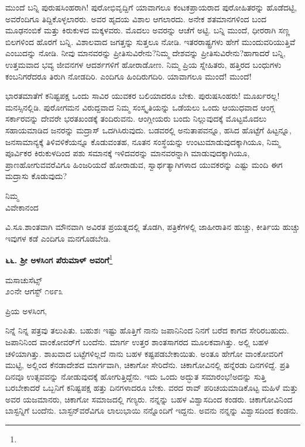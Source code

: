 ಮುಂದೆ ಬನ್ನಿ ಪುರುಷಸಿಂಹರಾಗಿ! ಪುರೋಭಿವೃದ್ದಿಗೆ ಯಾವಾಗಲೂ ಕಂಟಕಪ್ರಾಯರಾದ ಪುರೋಹಿತರನ್ನು ಹೊಡೆದಟ್ಟಿ, ಅವರೆಂದಿಗೂ ತಿದ್ದಿಕೊಳ್ಳಲಾರರು. ಅವರ ಹೃದಯ ವಿಶಾಲ ಆಗಲಾರದು. ಅನೇಕ ಶತಮಾನಗಳಿಂದ ಬಂದ ಮೂಢನಂಬಿಕೆ ಮತ್ತು ಕಿರುಕುಳದ ಮಕ್ಕಳವರು. ಮೊದಲು ಅವರನ್ನು ಆಚೆಗೆ ಅಟ್ಟಿ. ಬನ್ನಿ ಮುಂದೆ, ಧೀರರಾಗಿ ಸಣ್ಣ ಬಿಲಗಳಿಂದ ಹೊರಗೆ ಬನ್ನಿ. ವಿಶಾಲವಾದ ಜಗತ್ತನ್ನು ಸುತ್ತಲೂ ನೋಡಿ. ಇತರರಾಷ್ಟ್ರಗಳು ಹೇಗೆ ಮುಂದುವರಿಯುತ್ತಿವೆ ಎಂಬುದನ್ನು ನೋಡಿ. ನೀವು ಮಾನವರನ್ನು ಪ್ರೀತಿಸುವಿರೇನು?ನಿಮ್ಮ ದೇಶವನ್ನು ಪ್ರೀತಿಸುವಿರೇನು?ಹಾಗಾದರೆ ಬನ್ನಿ, ಉತ್ತಮವಾದ ಭವ್ಯ ಜೀವನಗಳ ಆದರ್ಶಗಳಿಗೆ ಹೋರಾಡೋಣ. ನಿಮ್ಮ ಪ್ರಿಯ ಸ್ನೇಹಿತರು, ಹತ್ತಿರದ ಬಂಧುಗಳು ಕಂಬನಿಗರೆದರೂ ತಿರುಗಿ ನೋಡದಿರಿ. ಎಂದಿಗೂ ಹಿಂದಿರುಗದಿರಿ. ಯಾವಾಗಲೂ ಮುಂದೆ! ಮುಂದೆ!

ಭಾರತಮಾತೆಗೆ ಕನಿಷ್ಟಪಕ್ಷ ಒಂದು ಸಾವಿರ ಯುವಕರ ಬಲಿಯಾದರೂ ಬೇಕು. ಪುರುಷಸಿಂಹರು! ಮೂರ್ಖರಲ್ಲ! ಮನಸ್ಸಿನಲ್ಲಿಡಿ. ಪುರೋಗಮನ ವಿರುದ್ದವಾದ ನಿಮ್ಮ ಸಂಸ್ಕೃತಿಯನ್ನು ಒಡೆಯಲು ಒಂದು ಆಯುಧವಾದ ಆಂಗ್ಲ ಸರ್ಕಾರವನ್ನು ದೇವರೇ ಭರತಖಂಡಕ್ಕೆ ತಂದಿರುವನು. ಆಂಗ್ಲೀಯರು ಬಂದು ನಿಲ್ಲುವುದಕ್ಕೆ ಮೊಟ್ಟಮೊದಲು ಸಹಾಯಮಾಡಿದ ಜನರನ್ನು ಮದ್ರಾಸ್ ಒದಗಿಸಿರುವುದು. ಬಡವರಲ್ಲಿ ಅನುತಾಪವನ್ನೂ, ಹಸಿದ ಹೊಟ್ಟೆಗೆ ಹಿಟ್ಟನ್ನೂ, ಜನಸಾಮಾನ್ಯಕ್ಕೆ ತಿಳಿವಳಿಕೆಯನ್ನೂ ಕೊಡುವಂತಹ, ನೂತನ ಸಂಸ್ಥೆಯನ್ನು ಉಂಟುಮಾಡುವುದಕ್ಕಾಗಿಯೂ, ನಿಮ್ಮ ಪೂರ್ವಿಕರ ಕಿರುಕುಳದಿಂದ ಪಶು ಸಮಾನಕ್ಕೆ ಇಳಿದವರನ್ನು ಮಾನವರನ್ನಾಗಿ ಮಾಡುವುದಕ್ಕಾಗಿಯೂ, ಪ್ರಾಣಹೋಗುವವರೆವಿಗೂ ಹಿಂಜರಿಯದೆ ಹೋರಾಡುವ, ಸ್ವಾರ್ಥತ್ಯಾಗಿಗಳಾದ ಯುವಕರನ್ನು ಎಷ್ಟು ಮಂದಿ ಈಗ ಮದ್ರಾಸು ಕೊಡುವುದು?

{\flushright
ನಿಮ್ಮ\\ವಿವೇಕಾನಂದ\par}

\smallskip

ವಿ.ಸೂ.\enginline{-}ಶಾಂತವಾಗಿ ಮೌನವಾಗಿ ಅವಿರತ ಪ್ರಯತ್ನದಲ್ಲಿ ತೊಡಗಿ, ಪತ್ರಿಕೆಗಳಲ್ಲಿ ಜಾಹೀರಾತಿನ ಹುಚ್ಚು, ಕೀರ್ತಿಯ ಹುಚ್ಚು ಇವುಗಳ ಕಡೆ ಎಂದಿಗೂ ಮನಗೊಡಬೇಡಿ.

\newpage

\begin{center}
\textbf{೬೬. ಶ‍್ರೀ ಅಳಸಿಂಗ ಪೆರುಮಾಳ್ ಅವರಿಗೆ}\footnote{}
\end{center}
\vspace{-0.5cm}

\begin{flushright}
ಮಸಾಚುಸೆಟ್ಸ್\\೨೦ನೇ ಆಗಸ್ಟ್ ೧೮೯೩
\end{flushright}
\vspace{-0.5cm}

\noindent
ಪ್ರಿಯ ಅಳಸಿಂಗ,

ನಿನ್ನೆ ನಿನ್ನ ಪತ್ರವು ತಲುಪಿತು. ಬಹುಶಃ ಇಷ್ಟು ಹೊತ್ತಿಗೆ ನಾನು ಜಪಾನಿನಿಂದ ನಿನಗೆ ಬರೆದ ಕಾಗದ ಸೇರಿರಬಹುದು. ಜಪಾನಿನಿಂದ ವಾಂಕೋವರ್‌ಗೆ ಬಂದೆನು. ಮಾರ್ಗ ಉತ್ತರ ಶಾಂತಸಾಗರದ ಮೂಲಕವಾಗಿತ್ತು. ಅಲ್ಲಿ ಬಹಳ ಚಳಿಯಾಗಿತ್ತು. ಶಾಖವಾದ ಬಟ್ಟೆಗಳಿಲ್ಲದೆ ನಾನು ಬಹಳ ಕಷ್ಟಪಡಬೇಕಾಯಿತು. ಅಂತೂ ಹೇಗೋ ವಾಂಕೋವರಿಗೆ ಮುಟ್ಟಿ, ಅಲ್ಲಿಂದ ಕೆನಡಾದೇಶದ ಮಾರ್ಗವಾಗಿ, ಚಿಕಾಗೋ ಸೇರಿದೆನು. ಚಿಕಾಗೋವಿನಲ್ಲಿ ಹನ್ನೆರಡು ದಿನಗಳಿದ್ದೆ. ಪ್ರತಿ ದಿನವೂ ಉತ್ಸವವನ್ನು ನೋಡುವುದಕ್ಕೆ ಹೋಗುತ್ತಿದ್ದೆನು. ಇದು ಒಂದು ಅದ್ಭುತ ಸಮಾರಂಭ!ಅದನ್ನು ಸುತ್ತಿ ಬರಬೇಕಾದರೆ ಒಬ್ಬನಿಗೆ ಕನಿಷ್ಟಪಕ್ಷ ಹತ್ತು ದಿನಗಳಾದರೂ ಬೇಕು. ವರದ ರಾವ್ ಪರಿಚಯಮಾಡಿಕೊಟ್ಟ ಮಹಿಳೆ ಮತ್ತು ಅವರ ಯಜಮಾನರು, ಚಿಕಾಗೋ ಸಮಾಜದಲ್ಲಿ ಗಣ್ಯರು. ನನ್ನನ್ನು ಬಹಳ ವಿಶ್ವಾಸದಿಂದ ಕಂಡರು. ಚಿಕಾಗೋವಿನಿಂದ ಬಾಸ್ಟನ್ನಿಗೆ ಬಂದೆನು. ಬಾಸ್ಟನ್‌ವರೆವಿಗೂ ಲಾಲುಭಾಯಿ ನನ್ನೊಂದಿಗೆ ಇದ್ದನು. ಅವನು ನನ್ನನ್ನು ವಿಶ್ವಾಸದಿಂದ ಕಂಡನು.

